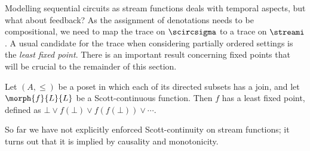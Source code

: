 \documentclass{lmcs}
\begin{document}
Modelling sequential circuits as stream functions deals with temporal
aspects, but what about feedback?
As the assignment of denotations needs to be compositional, we need
to map the trace on \(\scircsigma\) to a trace on \(\streami\).
A usual candidate for the trace when considering partially ordered settings is
the \emph{least fixed point}.
There is an important result concerning fixed points that will be crucial to
the remainder of this section.

\begin{thm}
    Let \((A, \leq)\) be a poset in which each of its directed subsets has a
    join, and let \(\morph{f}{L}{L}\) be a Scott-continuous function.
    Then \(f\) has a least fixed point, defined as \(
    \bot \vee f(\bot) \vee f(f(\bot)) \vee \cdots
    \).
\end{thm}

So far we have not explicitly enforced Scott-continuity on stream functions; it
turns out that it is implied by causality and monotonicity.
\end{document}

